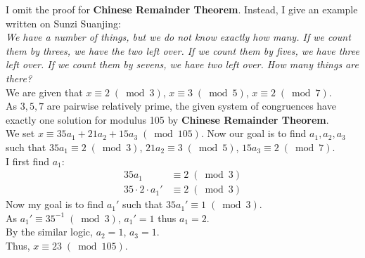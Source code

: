I omit the proof for \textbf{Chinese Remainder Theorem}. Instead, I give an example written on Sunzi Suanjing: \\
\textit{We have a number of things, but we do not know exactly how many. If we count them by threes, we have the two left over. If we count them by fives, we have three left over. If we count them by sevens, we have two left over. How many things are there?} \\
We are given that $x\equiv 2\; (\bmod{3})$, $x\equiv 3\; (\bmod{5})$, $x\equiv 2\; (\bmod{7})$. \\
As $3, 5, 7$ are pairwise relatively prime, the given system of congruences have exactly one solution for modulus 105 by \textbf{Chinese Remainder Theorem}. \\
We set $x\equiv 35a_{1} + 21a_{2} + 15a_{3}\; (\bmod{105})$. Now our goal is to find $a_{1},a_{2},a_{3}$ such that $35a_{1}\equiv 2\; (\bmod{3})$, $21a_{2}\equiv 3\; (\bmod{5})$, $15a_{3}\equiv 2\; (\bmod{7})$. \\
I first find $a_{1}$:
\begin{align*}
  35a_{1} &\equiv 2\; (\bmod{3}) \\
  35\cdot 2\cdot a_{1}' &\equiv 2\; (\bmod{3})
\end{align*}
Now my goal is to find $a_{1}'$ such that $35a_{1}'\equiv 1\; (\bmod{3})$. \\
As $a_{1}'\equiv 35^{-1}\; (\bmod{3})$, $a_{1}' =  1$ thus $a_{1} = 2$. \\
By the similar logic, $a_{2} = 1$, $a_{3} = 1$. \\
Thus, $x\equiv 23\; (\bmod{105})$.